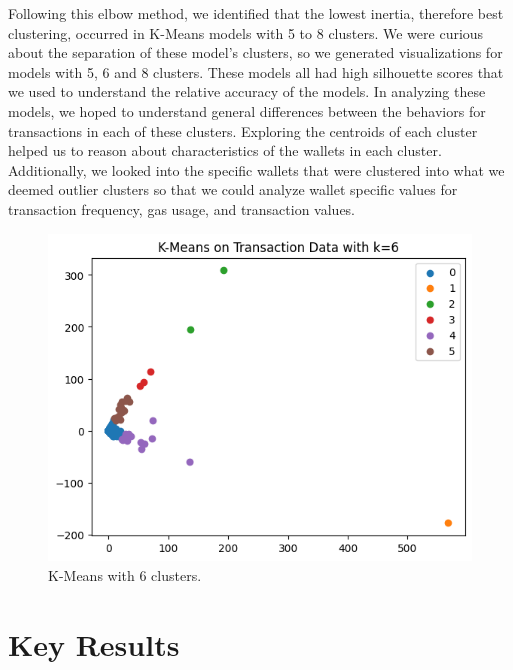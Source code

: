 \documentclass[sigconf]{acmart}
\begin{document}
Following this elbow method, we identified that the lowest inertia, therefore best clustering, occurred in K-Means models with 5 to 8 clusters. We were curious about the separation of these model’s clusters, so we generated visualizations for models with 5, 6 and 8 clusters. These models all had high silhouette scores that we used to understand the relative accuracy of the models. In analyzing these models, we hoped to understand general differences between the behaviors for transactions in each of these clusters. Exploring the centroids of each cluster helped us to reason about characteristics of the wallets in each cluster. Additionally, we looked into the specific wallets that were clustered into what we deemed outlier clusters so that we could analyze wallet specific values for transaction frequency, gas usage, and transaction values.  

\begin{figure}[H]
    \centering
    \includegraphics[width=0.8\linewidth]{M6-k-6.png}
    \caption{K-Means with 6 clusters.}
    \label{fig:k6Clusters}
\end{figure}

\section{Key Results}
\end{document}
